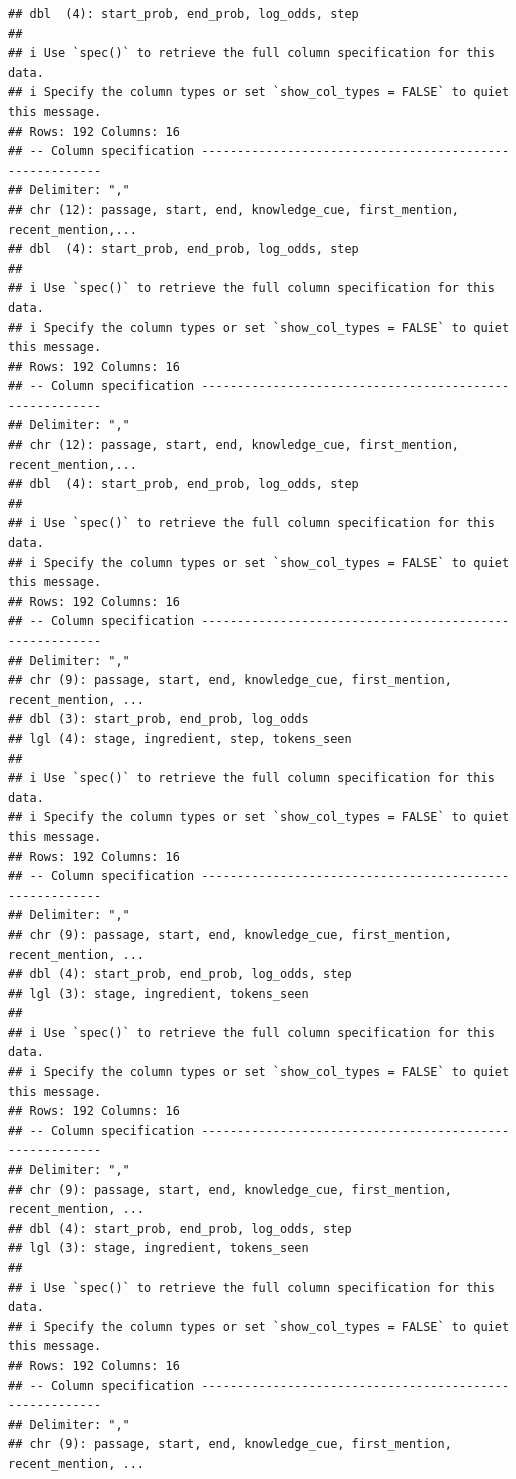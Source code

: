 \documentclass[
]{article}
\begin{document}
\begin{verbatim}
## dbl  (4): start_prob, end_prob, log_odds, step
## 
## i Use `spec()` to retrieve the full column specification for this data.
## i Specify the column types or set `show_col_types = FALSE` to quiet this message.
## Rows: 192 Columns: 16
## -- Column specification --------------------------------------------------------
## Delimiter: ","
## chr (12): passage, start, end, knowledge_cue, first_mention, recent_mention,...
## dbl  (4): start_prob, end_prob, log_odds, step
## 
## i Use `spec()` to retrieve the full column specification for this data.
## i Specify the column types or set `show_col_types = FALSE` to quiet this message.
## Rows: 192 Columns: 16
## -- Column specification --------------------------------------------------------
## Delimiter: ","
## chr (12): passage, start, end, knowledge_cue, first_mention, recent_mention,...
## dbl  (4): start_prob, end_prob, log_odds, step
## 
## i Use `spec()` to retrieve the full column specification for this data.
## i Specify the column types or set `show_col_types = FALSE` to quiet this message.
## Rows: 192 Columns: 16
## -- Column specification --------------------------------------------------------
## Delimiter: ","
## chr (9): passage, start, end, knowledge_cue, first_mention, recent_mention, ...
## dbl (3): start_prob, end_prob, log_odds
## lgl (4): stage, ingredient, step, tokens_seen
## 
## i Use `spec()` to retrieve the full column specification for this data.
## i Specify the column types or set `show_col_types = FALSE` to quiet this message.
## Rows: 192 Columns: 16
## -- Column specification --------------------------------------------------------
## Delimiter: ","
## chr (9): passage, start, end, knowledge_cue, first_mention, recent_mention, ...
## dbl (4): start_prob, end_prob, log_odds, step
## lgl (3): stage, ingredient, tokens_seen
## 
## i Use `spec()` to retrieve the full column specification for this data.
## i Specify the column types or set `show_col_types = FALSE` to quiet this message.
## Rows: 192 Columns: 16
## -- Column specification --------------------------------------------------------
## Delimiter: ","
## chr (9): passage, start, end, knowledge_cue, first_mention, recent_mention, ...
## dbl (4): start_prob, end_prob, log_odds, step
## lgl (3): stage, ingredient, tokens_seen
## 
## i Use `spec()` to retrieve the full column specification for this data.
## i Specify the column types or set `show_col_types = FALSE` to quiet this message.
## Rows: 192 Columns: 16
## -- Column specification --------------------------------------------------------
## Delimiter: ","
## chr (9): passage, start, end, knowledge_cue, first_mention, recent_mention, ...

\end{verbatim}
\end{document}
